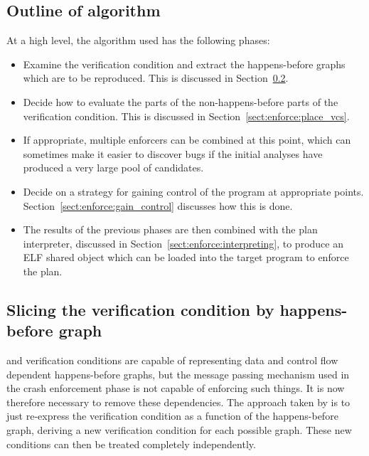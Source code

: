 \subsection{Outline of algorithm}

At a high level, the algorithm used has the following phases:

\begin{itemize}
\item
  Examine the verification condition and extract the happens-before
  graphs which are to be reproduced.  This is discussed in
  Section~\ref{sect:enforce:slice_hb_graph}.
\item
  Decide how to evaluate the parts of the non-happens-before parts of
  the verification condition.  This is discussed in
  Section~\ref{sect:enforce:place_vcs}.
\item
  If appropriate, multiple enforcers can be combined at this point,
  which can sometimes make it easier to discover bugs if the initial
  analyses have produced a very large pool of
  candidates.
\item
  Decide on a strategy for gaining control of the program at
  appropriate points.  Section~\ref{sect:enforce:gain_control}
  discusses how this is done.

\item
  The results of the previous phases are then combined with the plan
  interpreter, discussed in Section~\ref{sect:enforce:interpreting},
  to produce an ELF shared object which can be loaded into the target
  program to enforce the plan.
\end{itemize}

\subsection{Slicing the verification condition by happens-before graph}
\label{sect:enforce:slice_hb_graph}


{\STateMachines} and verification conditions are capable of
representing data and control flow dependent happens-before graphs,
but the message passing mechanism used in the crash enforcement phase
is not capable of enforcing such things.  It is now therefore
necessary to remove these dependencies.  The approach taken by
{\implementation} is to just re-express the verification condition as
a function of the happens-before graph, deriving a new verification
condition for each possible graph.  These new conditions can then be
treated completely independently.

